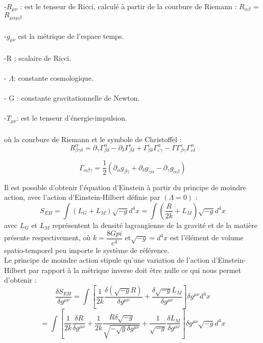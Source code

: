 \documentclass[12pt,  a4paper, openright]{report} %
\begin{document}
	-$ R_{\mu\nu}$ : est le tenseur de Ricci, calculé à partir de la courbure de Riemann : $R_{\alpha\beta}$ =$ R_{\mu\alpha\mu\beta}$\\
	\\
	-$g_{\mu\nu}$ est la métrique de l’espace temps.\\
	\\
	-R : scalaire de Ricci.\\
	\\
	- $\Lambda$: constante cosmologique.\\
	\\
	- G : constante gravitationnelle de Newton.\\
	\\
	-$T_{\mu\nu}$: est le tenseur d’énergie-impulsion.\\
	\\
	où la courbure de Riemann et le symbole de Christoffel :
	\begin{equation}
	R_{\beta\gamma\delta}^{\alpha}= \partial_{\gamma}\Gamma_{\beta\delta}^{\alpha}-\partial_{\delta}\Gamma_{\beta\delta}^{\varepsilon}+ \Gamma_{\beta\delta}^{\varepsilon}         \Gamma_{\varepsilon\gamma}^\alpha- \Gamma\Gamma_{\beta\gamma}^{\varepsilon}\Gamma_{\varepsilon\delta}^{\alpha}
	\end{equation}
	
	
	\begin{equation}
	\Gamma_{\alpha\beta\gamma} = \dfrac{1}{2}( \partial_{\alpha}g_{\beta\gamma}+\partial_{\delta}g_{\gamma\alpha}-\partial_{\gamma}g_{\alpha\beta})
	\end{equation}
	
	Il est possible d’obtenir l’équation d’Einstein à partir du principe de moindre action, avec
	l’action d’Einstein-Hilbert définie par $(\Lambda = 0)$ :
	\begin{equation}
	S_{EH} = \int (L_{G} + L_{M})\sqrt{-g} d^{4}x =  \int\left(\dfrac{R}{2k} + L_{M} \right)\sqrt{-g} d^{4}x
	\end{equation}
	avec $L_{G}$ et $L_{M}$ représentent la densité lagrangienne de la gravité et de la matière présente
	respectivement, où $k = \dfrac{8Gpi}{c^{4}}$  et$ \sqrt{-g} = d^{4}x$ est l’élément de volume spatio-temporel peu importe le système de référence.\\
	Le principe de moindre action stipule qu’une variation de l’action d’Einstein-Hilbert par rapport
	à la métrique inverse doit être nulle ce qui nous permet d’obtenir :
	\begin{equation}
	\dfrac{\delta S_{EH}}{\delta g^{\mu\nu}} = \int\left[\dfrac{1}{2k}\dfrac{\delta (\sqrt{-g}R)}{
		\delta g^{\mu\nu}}+\dfrac{\delta \sqrt{-g}L_{M}}{\delta g^{\mu\nu}} \right]\delta g^{\mu\nu}d^{4}x
	\end{equation}
	\begin{equation}
	= \int\left[\dfrac{1}{2k}\dfrac{\delta R}{\delta g^{\mu\nu}}+\dfrac{1}{2k}\dfrac{R\delta \sqrt{-g}}{\sqrt{-\sqrt{g}\delta g^{\mu\nu}}}+\dfrac{1}{\sqrt{-g}}\dfrac{\delta L_{M}}{\delta g^{\mu\nu}}\right]\delta g^{\mu\nu}\sqrt{-g}d^{4}x 
	\end{equation}
	
\end{document}
